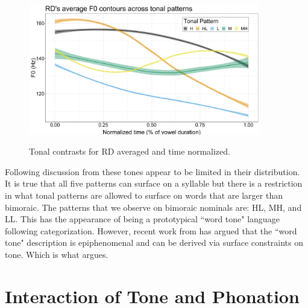\documentclass[12pt, letterpaper]{article}
\begin{document}
\begin{figure}[!ht]
	\centering
	\includegraphics[width=0.9\textwidth]{../RDTonePlot.png}
	\label{fig:RDTonePlot}
	\caption{Tonal contrasts for RD averaged and time normalized.}
\end{figure}

Following discussion from \citet{brinkerhoffTonalPatternsTheir2022} these tones appear to be limited in their distribution. It is true that all five patterns can surface on a syllable but there is a restriction in what tonal patterns are allowed to surface on words that are larger than bimoraic. The patterns that we observe on bimoraic nominals are: HL, MH, and LL. This has the appearance of being a prototypical ``word tone" language following  categorization. However, recent work from \citet{shihAutosegmentalAimsSurfaceOptimizing2019,mcphersonWordToneEpiphenomenalInpress} has argued that the ``word tone" description is epiphenomenal and can be derived via surface constraints on tone. Which is what \citet{brinkerhoffTonalPatternsTheir2022} argues. 

\section{Interaction of Tone and Phonation} \label{sec:Interaction}
\end{document}
